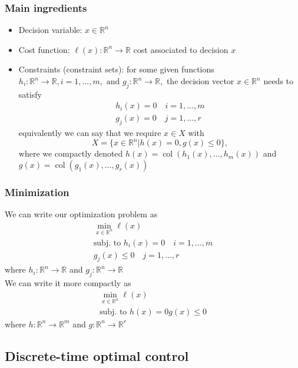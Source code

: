 \documentclass{book}
\DeclareMathOperator{\col}{col}
\newcommand{\R}{\mathbb{R}}
\theoremstyle{definition}
\theoremstyle{remark}
\theoremstyle{remark}
\begin{document}
\subsubsection{Main ingredients}
\begin{itemize}
    \item Decision variable: $x\in\R^n$ 
    \item Cost function: $\ell(x):\R^n\to\R$ cost associated to decision $x$
    \item Constraints (constraint sets): for some given functions $h_i:\R^n\to\R, i=1,\dots,m, \text{ and } g_j:\R^n\to\R,$ the decision vector $x\in\R^n$ needs to satisfy 
        \begin{gather*}
            h_i(x)=0 \quad i=1,\dots,m \\
            g_j(x)=0 \quad j=1,\dots,r
        \end{gather*}
        equivalently we can say that we require $x\in X$ with 
        \[
            X=\{x\in\R^n|h(x)=0, g(x)\leq 0\},
        \]
        where we compactly denoted $h(x)=\col(h_1(x),\dots,h_m(x))$ and $g(x) = \col(g_1(x),\dots,g_r(x))$
\end{itemize}

\subsubsection{Minimization}
We can write our optimization problem as 
\begin{gather}
    \min_{x\in\R^n} \ell(x)\\
    \text{subj. to } h_i(x) = 0 \quad i=1,\dots,m\\
    g_j(x)\leq 0 \quad j=1,\dots,r
\end{gather}
where $h_i:\R^n\to\R$ and $g_j:\R^n\to\R$\\
We can write it more compactly as 
\begin{gather*}
    \min_{x\in\R^n} \ell(x)\\
    \text{subj. to } h(x) = 0 
    g(x)\leq 0 
\end{gather*}
where $h:\R^n\to\R^m$ and $g:\R^n\to\R^r$
\subsection{Discrete-time optimal control}
\end{document}
